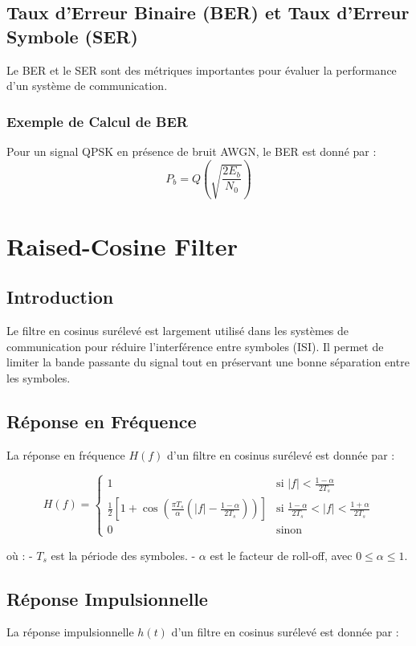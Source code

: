 \documentclass[10pt,a4paper]{article}
\begin{document}
\subsection*{Taux d'Erreur Binaire (BER) et Taux d'Erreur Symbole (SER)}
Le BER et le SER sont des métriques importantes pour évaluer la performance d'un système de communication.

\subsubsection*{Exemple de Calcul de BER}
Pour un signal QPSK en présence de bruit AWGN, le BER est donné par :
\[ P_b = Q\left(\sqrt{\frac{2E_b}{N_0}}\right) \]

\section*{Raised-Cosine Filter}

\subsection*{Introduction}
Le filtre en cosinus surélevé est largement utilisé dans les systèmes de communication pour réduire l'interférence entre symboles (ISI). Il permet de limiter la bande passante du signal tout en préservant une bonne séparation entre les symboles.

\subsection*{Réponse en Fréquence}
La réponse en fréquence \( H(f) \) d'un filtre en cosinus surélevé est donnée par :

\[
H(f) =
  \begin{cases}
   1 & \text{si } |f| < \frac{1 - \alpha}{2T_s} \\
   \frac{1}{2} \left[1 + \cos\left(\frac{\pi T_s}{\alpha} \left(|f| - \frac{1 - \alpha}{2T_s}\right)\right)\right] & \text{si } \frac{1 - \alpha}{2T_s} < |f| < \frac{1 + \alpha}{2T_s} \\
   0 & \text{sinon}
  \end{cases}
\]

où :
- \( T_s \) est la période des symboles.
- \( \alpha \) est le facteur de roll-off, avec \( 0 \leq \alpha \leq 1 \).

\subsection*{Réponse Impulsionnelle}
La réponse impulsionnelle \( h(t) \) d'un filtre en cosinus surélevé est donnée par :
\end{document}
